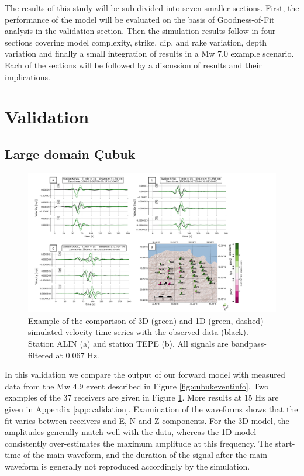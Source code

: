 \documentclass[../Text/00main.tex]{subfiles}
\begin{document}
The results of this study will be sub-divided into seven smaller sections. First, the performance of the model will be evaluated on the basis of Goodness-of-Fit analysis in the validation section. Then the simulation results follow in four sections covering model complexity, strike, dip, and rake variation, depth variation and finally a small integration of results in a Mw 7.0 example scenario. Each of the sections will be followed by a discussion of results and their implications.

\section{Validation}\label{sec:validation}

\subsection{Large domain Çubuk}


\begin{figure}[htb!]
    \centering
    \includegraphics[width=1\linewidth]{images_results/waveforms_large.png}%
    \caption{Example of the comparison of 3D (green) and 1D (green, dashed) simulated velocity time series with the observed data (black). Station ALIN (a) and station TEPE (b). All signals are bandpass-filtered at 0.067 Hz.}%
    \label{fig:TEPEandALIN}%
\end{figure}



In this validation we compare the output of our forward model with measured data from the Mw 4.9 event described in Figure \ref{fig:cubukeventinfo}. Two examples of the 37 receivers are given in Figure \ref{fig:TEPEandALIN}.  More results at 15 Hz are given in Appendix \ref{app:validation}. Examination of the waveforms shows that the fit varies between receivers and E, N and Z components. For the 3D model, the amplitudes generally match well with the data, whereas the 1D model consistently over-estimates the maximum amplitude at this frequency. The start-time of the main waveform, and the duration of the signal after the main waveform is generally not reproduced accordingly by the simulation.
\end{document}
